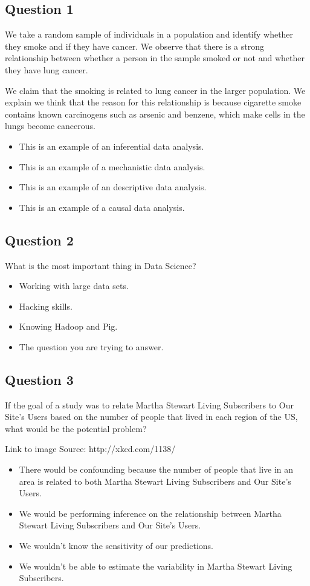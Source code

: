 \subsection*{Question 1}
We take a random sample of individuals in a population and identify whether they smoke and if they have cancer. We observe that there is a strong relationship between whether a person in the sample smoked or not and whether they have lung cancer. 

We claim that the smoking is related to lung cancer in the larger population. We explain we think that the reason for this relationship is because cigarette smoke contains known carcinogens such as arsenic and benzene, which make cells in the lungs become cancerous.
\begin{itemize}
\item This is an example of an inferential data analysis.
\item This is an example of a mechanistic data analysis.
\item This is an example of an descriptive data analysis.
\item This is an example of a causal data analysis.
\end{itemize}
\subsection*{Question 2}
What is the most important thing in Data Science?
\begin{itemize}
\item Working with large data sets.
\item Hacking skills.
\item Knowing Hadoop and Pig.
\item The question you are trying to answer.
\end{itemize}
\subsection*{Question 3}
If the goal of a study was to relate Martha Stewart Living Subscribers to Our Site's Users based on the number of people that lived in each region of the US, what would be the potential problem? 



Link to image 
Source: http://xkcd.com/1138/
\begin{itemize}
\item There would be confounding because the number of people that live in an area is related to both Martha Stewart Living Subscribers and Our Site's Users.
\item We would be performing inference on the relationship between Martha Stewart Living Subscribers and Our Site's Users.
\item We wouldn't know the sensitivity of our predictions.
\item We wouldn't be able to estimate the variability in Martha Stewart Living Subscribers.
\end{itemize}
